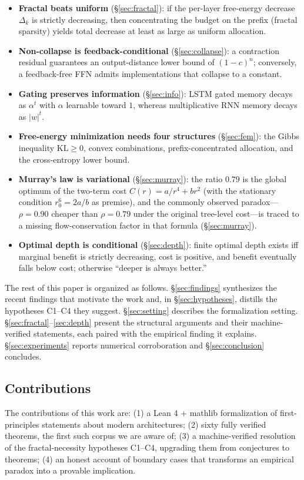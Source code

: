 \documentclass[conference]{IEEEtran}
\begin{document}
\begin{itemize}
\item \textbf{Fractal beats uniform} (\S\ref{sec:fractal}): if the per-layer
free-energy decrease $\Delta_k$ is strictly decreasing, then concentrating the
budget on the prefix (fractal sparsity) yields total decrease at least as large
as uniform allocation.
\item \textbf{Non-collapse is feedback-conditional} (\S\ref{sec:collapse}): a
contraction residual guarantees an output-distance lower bound of
$(1-c)^n$; conversely, a feedback-free FFN admits implementations that collapse
to a constant.
\item \textbf{Gating preserves information} (\S\ref{sec:info}): LSTM gated
memory decays as $\alpha^t$ with $\alpha$ learnable toward $1$, whereas
multiplicative RNN memory decays as $|w|^t$.
\item \textbf{Free-energy minimization needs four structures}
(\S\ref{sec:fem}): the Gibbs inequality $\mathrm{KL}\ge0$, convex combinations,
prefix-concentrated allocation, and the cross-entropy lower bound.
\item \textbf{Murray's law is variational} (\S\ref{sec:murray}): the ratio
$0.79$ is the global optimum of the two-term cost $C(r)=a/r^4+br^2$ (with the
stationary condition $r_0^6=2a/b$ as premise), and the commonly observed
paradox---$\rho=0.90$ cheaper than $\rho=0.79$ under the original tree-level
cost---is traced to a missing flow-conservation factor in that formula
(\S\ref{sec:murray}).
\item \textbf{Optimal depth is conditional} (\S\ref{sec:depth}): finite optimal
depth exists iff marginal benefit is strictly decreasing, cost is positive, and
benefit eventually falls below cost; otherwise ``deeper is always better.''
\end{itemize}

The rest of this paper is organized as follows. \S\ref{sec:findings}
synthesizes the recent findings that motivate the work and, in
\S\ref{sec:hypotheses}, distills the hypotheses C1--C4 they suggest. \S\ref{sec:setting} describes the formalization
setting. \S\ref{sec:fractal}--\ref{sec:depth} present the structural arguments
and their machine-verified statements, each paired with the empirical finding
it explains. \S\ref{sec:experiments} reports numerical corroboration and
\S\ref{sec:conclusion} concludes.

\subsection{Contributions}
The contributions of this work are: (1) a Lean 4 + mathlib formalization of
first-principles statements about modern architectures; (2) sixty fully verified
theorems, the first such corpus we are aware of; (3) a machine-verified
resolution of the fractal-necessity hypotheses C1--C4, upgrading them from
conjectures to theorems; (4) an honest account of boundary cases that
transforms an empirical paradox into a provable implication.
\end{document}
